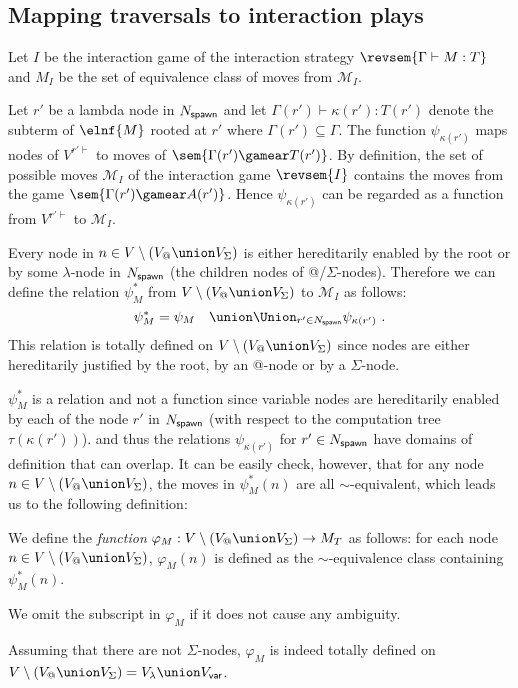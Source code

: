 \subsection{Mapping traversals to interaction plays}

    Let $I$ be the interaction game of the interaction strategy $\revsem{\Gamma \vdash M : T}$ and
    $M_I$ be the set of equivalence class of moves from $\mathcal{M}_I$.

    Let $r'$ be a lambda node in $N_{\sf spawn}$ and let $\Gamma(r') \vdash \kappa(r') : T(r')$ denote the subterm of $\elnf{M}$ rooted at $r'$ where $\Gamma(r')\subseteq \Gamma$.
    The function $\psi_{\kappa(r')}$ maps nodes of $V^{r'\vdash}$
    to moves of $\sem{\Gamma(r') \gamear T(r')}$. By definition,
    the set of possible moves $\mathcal{M}_I$ of the interaction game $\revsem{I}$ contains the
    moves from the game $\sem{\Gamma(r') \gamear A(r')}$. Hence $\psi_{\kappa(r')}$ can be regarded as a function from $V^{r'\vdash}$ to $\mathcal{M}_I$.

    Every node in $n \in V\setminus (V_@ \union V_\Sigma)$ is either hereditarily enabled by the root or by some $\lambda$-node in $N_{\sf spawn}$ (the children nodes of @/$\Sigma$-nodes). Therefore we can define the relation $\psi^*_M$ from
    $V\setminus (V_@ \union V_\Sigma)$ to $\mathcal{M}_I$ as follows:
    $$ \psi^*_M = \psi_{M} \quad \union \Union_{r' \in N_{\sf spawn}} \psi_{\kappa(r')} \ .$$
    This relation is totally defined on $V\setminus (V_@ \union V_\Sigma)$ since nodes are either hereditarily justified by the root, by an @-node or by a $\Sigma$-node.

    $\psi^*_M$ is a relation and not a function since variable nodes are hereditarily enabled by
    each of the node $r'$ in $N_{\sf spawn}$ (with respect to the computation tree $\tau(\kappa(r'))$).
    and thus the relations $\psi_{\kappa(r')}$ for $r' \in N_{\sf spawn}$ have domains of definition that can overlap.
    It can be easily check, however, that for any node $n \in V\setminus (V_@ \union V_\Sigma)$,
    the moves in $\psi^*_M (n)$ are all $\sim$-equivalent, which leads us to the following definition:
    \begin{definition}
        \label{def:phi mapping}
        We define the \emph{function}
        $\varphi_M:V\setminus (V_@ \union V_\Sigma) \rightarrow M_T$ as follows: for each node $n \in V\setminus (V_@ \union V_\Sigma)$,
        $\varphi_M(n)$ is defined as the $\sim$-equivalence class containing $\psi^*_M (n)$.

        We omit the subscript in $\varphi_M$ if it does not cause any ambiguity.
    \end{definition}
    Assuming that there are not $\Sigma$-nodes, $\varphi_M$ is indeed totally defined on $V \setminus (V_@ \union V_\Sigma) = V_\lambda \union V_{\sf var}$.

